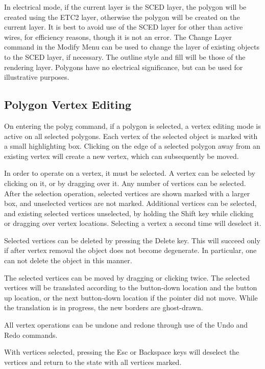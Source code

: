 In electrical mode, if the current layer is the SCED layer, the
polygon will be created using the ETC2 layer, otherwise the polygon
will be created on the current layer.  It is best to avoid use of the
SCED layer for other than active wires, for efficiency reasons, though
it is not an error.  The {\cb Change Layer} command in the {\cb Modify
Menu} can be used to change the layer of existing objects to the SCED
layer, if necessary.  The outline style and fill will be those of the
rendering layer.  Polygons have no electrical significance, but can be
used for illustrative purposes. 

\subsection{Polygon Vertex Editing}

On entering the {\cb polyg} command, if a polygon is selected, a
vertex editing mode is active on all selected polygons.  Each vertex
of the selected object is marked with a small highlighting box. 
Clicking on the edge of a selected polygon away from an existing
vertex will create a new vertex, which can subsequently be moved.

In order to operate on a vertex, it must be selected.  A vertex can be
selected by clicking on it, or by dragging over it.  Any number of
vertices can be selected.  After the selection operation, selected
vertices are shown marked with a larger box, and unselected vertices
are not marked.  Additional vertices can be selected, and existing
selected vertices unselected, by holding the {\kb Shift} key while
clicking or dragging over vertex locations.  Selecting a vertex a
second time will deselect it.

Selected vertices can be deleted by pressing the {\kb Delete} key. 
This will succeed only if after vertex removal the object does not
become degenerate.  In particular, one can not delete the object in
this manner.

The selected vertices can be moved by dragging or clicking twice.  The
selected vertices will be translated according to the button-down
location and the button up location, or the next button-down location
if the pointer did not move.  While the translation is in progress,
the new borders are ghost-drawn.

All vertex operations can be undone and redone through use of the {\cb
Undo} and {\cb Redo} commands.

With vertices selected, pressing the {\kb Esc} or {\kb Backspace} keys
will deselect the vertices and return to the state with all vertices
marked.


